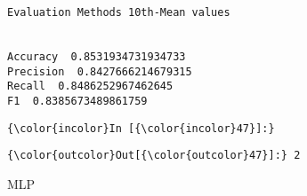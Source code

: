 \documentclass[11pt]{article}
\begin{document}
    \begin{Verbatim}[commandchars=\\\{\}]
Evaluation Methods 10th-Mean values


Accuracy  0.8531934731934733
Precision  0.8427666214679315
Recall  0.8486252967462645
F1  0.8385673489861759

    \end{Verbatim}

    \begin{Verbatim}[commandchars=\\\{\}]
{\color{incolor}In [{\color{incolor}47}]:} 
\end{Verbatim}


\begin{Verbatim}[commandchars=\\\{\}]
{\color{outcolor}Out[{\color{outcolor}47}]:} 2
\end{Verbatim}
            
    MLP
\end{document}
